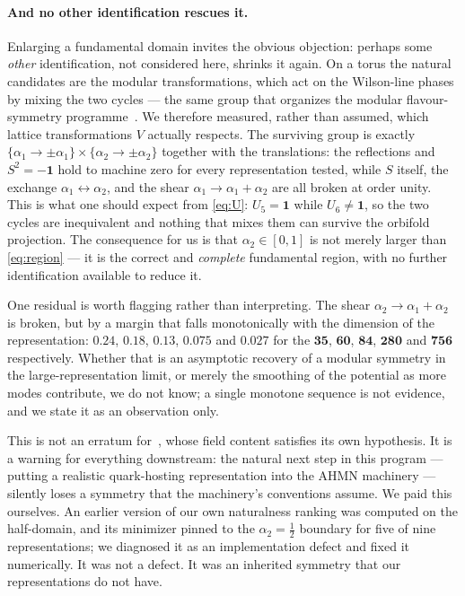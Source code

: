 \documentclass[11pt,a4paper]{article}
\begin{document}
\paragraph{And no other identification rescues it.} Enlarging a fundamental domain invites
the obvious objection: perhaps some \emph{other} identification, not considered here, shrinks
it again. On a torus the natural candidates are the modular transformations, which act on the
Wilson-line phases by mixing the two cycles --- the same group that organizes the modular
flavour-symmetry programme~\cite{Feruglio,RatzEclectic}. We therefore measured, rather than
assumed, which lattice transformations $V$ actually respects. The surviving group is exactly
$\{\alpha_1\to\pm\alpha_1\}\times\{\alpha_2\to\pm\alpha_2\}$ together with the translations:
the reflections and $S^2=-\mathbf{1}$ hold to machine zero for every representation tested,
while $S$ itself, the exchange $\alpha_1\leftrightarrow\alpha_2$, and the shear
$\alpha_1\to\alpha_1+\alpha_2$ are all broken at order unity. This is what one should expect
from \eqref{eq:U}: $U_5=\mathbf{1}$ while $U_6\neq\mathbf{1}$, so the two cycles are
inequivalent and nothing that mixes them can survive the orbifold projection. The
consequence for us is that $\alpha_2\in[0,1]$ is not merely larger than \eqref{eq:region} ---
it is the correct and \emph{complete} fundamental region, with no further identification
available to reduce it.

One residual is worth flagging rather than interpreting. The shear
$\alpha_2\to\alpha_1+\alpha_2$ is broken, but by a margin that falls monotonically with the
dimension of the representation: $0.24$, $0.18$, $0.13$, $0.075$ and $0.027$ for the
$\mathbf{35}$, $\mathbf{60}$, $\mathbf{84}$, $\mathbf{280}$ and $\mathbf{756}$
respectively. Whether that is an
asymptotic recovery of a modular symmetry in the large-representation limit, or merely the
smoothing of the potential as more modes contribute, we do not know; a single monotone
sequence is not evidence, and we state it as an observation only.

This is not an erratum for~\cite{AHMN}, whose field content satisfies its own hypothesis. It
is a warning for everything downstream: the natural next step in this program --- putting a
realistic quark-hosting representation into the AHMN machinery --- silently loses a symmetry
that the machinery's conventions assume. We paid this ourselves. An earlier version of our
own naturalness ranking was computed on the half-domain, and its minimizer pinned to the
$\alpha_2=\tfrac12$ boundary for five of nine representations; we diagnosed it as an
implementation defect and fixed it numerically. It was not a defect. It was an inherited
symmetry that our representations do not have.
\end{document}
